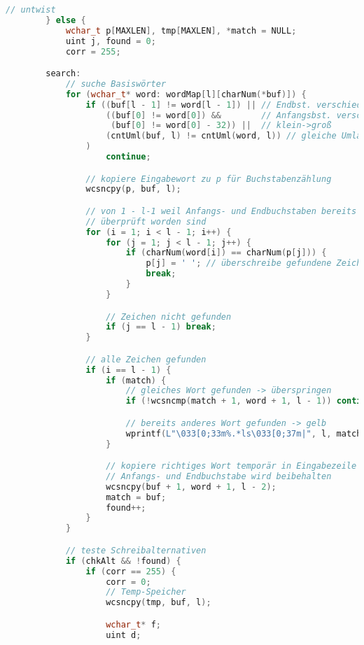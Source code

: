 \documentclass[a4paper,10pt,ngerman]{scrartcl}
\begin{document}
\begin{lstlisting}[language=C++]
            // untwist
        } else {
            wchar_t p[MAXLEN], tmp[MAXLEN], *match = NULL;
            uint j, found = 0;
            corr = 255;

        search:
            // suche Basiswörter
            for (wchar_t* word: wordMap[l][charNum(*buf)]) {
                if ((buf[l - 1] != word[l - 1]) || // Endbst. verschieden
                    ((buf[0] != word[0]) &&        // Anfangsbst. verschieden
                     (buf[0] != word[0] - 32)) ||  // klein->groß
                    (cntUml(buf, l) != cntUml(word, l)) // gleiche Umlautzahl
                )
                    continue;

                // kopiere Eingabewort zu p für Buchstabenzählung
                wcsncpy(p, buf, l);

                // von 1 - l-1 weil Anfangs- und Endbuchstaben bereits
                // überprüft worden sind
                for (i = 1; i < l - 1; i++) {
                    for (j = 1; j < l - 1; j++) {
                        if (charNum(word[i]) == charNum(p[j])) {
                            p[j] = ' '; // überschreibe gefundene Zeichen
                            break;
                        }
                    }

                    // Zeichen nicht gefunden
                    if (j == l - 1) break;
                }

                // alle Zeichen gefunden
                if (i == l - 1) {
                    if (match) {
                        // gleiches Wort gefunden -> überspringen
                        if (!wcsncmp(match + 1, word + 1, l - 1)) continue;

                        // bereits anderes Wort gefunden -> gelb
                        wprintf(L"\033[0;33m%.*ls\033[0;37m|", l, match);
                    }

                    // kopiere richtiges Wort temporär in Eingabezeile
                    // Anfangs- und Endbuchstabe wird beibehalten
                    wcsncpy(buf + 1, word + 1, l - 2);
                    match = buf;
                    found++;
                }
            }

            // teste Schreibalternativen
            if (chkAlt && !found) {
                if (corr == 255) {
                    corr = 0;
                    // Temp-Speicher
                    wcsncpy(tmp, buf, l);

                    wchar_t* f;
                    uint d;


\end{lstlisting}
\end{document}

